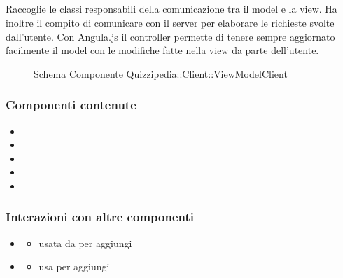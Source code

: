 \subsection{}
Raccoglie le classi responsabili della comunicazione tra il model e la view. Ha inoltre il compito di comunicare con il server per elaborare le richieste svolte dall'utente.
Con Angula.js il controller permette di tenere sempre aggiornato facilmente il model con le modifiche fatte nella view da parte dell'utente.
\begin{figure}[H]
\centering
\noindent{}
\caption[Schema Componente Quizzipedia::Client::ViewModelClient]{Schema Componente Quizzipedia::Client::ViewModelClient}
\end{figure}
\subsubsection{Componenti contenute}
\begin{itemize}
\item {}
\item {}
\item {}
\item {}
\item {}
\end{itemize}
\subsubsection{Interazioni con altre componenti}
\begin{itemize}
\item {}
\begin{itemize}
\item usata da  per aggiungi
\end{itemize}
\item {}
\begin{itemize}
\item usa  per aggiungi
\end{itemize}
\end{itemize}
